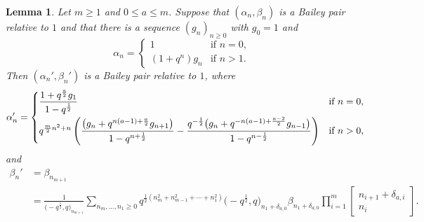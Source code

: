 \documentclass[pdftex]{sigma}
\newtheorem{Lemma}[Theorem]{Lemma}
\numberwithin{equation}{section}
\begin{document}
\begin{Lemma} \label{lemma:dilationpair}
Let $m \geq 1$ and $0 \leq a \leq m$. Suppose that $(\alpha_n,\beta_n)$ is a Bailey pair relative to $1$ and that there is a sequence $(g_n)_{n \geq 0}$ with $g_0 = 1$ and
\begin{equation*}
	\alpha_n =
	\begin{cases}
		1 &\text{if $n= 0$}, \\
		(1+q^n)g_n &\text{if $n > 1$}.
	\end{cases}
\end{equation*}
Then $(\alpha_n',\beta_n')$ is a Bailey pair relative to $1$, where
\begin{gather} \label{eqn:dilationpairalpha}
	\alpha_n' =
	\begin{cases}
		\dfrac{1+q^{\frac{a}{2}}g_1}{1-q^{\frac{1}{2}}} &\text{if $n = 0$}, \vspace{1mm}\\
		q^{\frac{m}{2}n^2+n}\left( \dfrac{\bigl(g_n + q^{n(a-1)+ \frac{a}{2}}g_{n+1}\bigr)}{1-q^{n+\frac{1}{2}}} - \dfrac{q^{-\frac{1}{2}}\bigl(g_n + q^{-n(a-1) + \frac{a-2}{2}}g_{n-1}\bigr)}{1-q^{n - \frac{1}{2}}} \right) &\text{if $n > 0$},
	\end{cases}\!\!\!\!
\end{gather}
and
\begin{align}
		\beta_n' &{}=\beta_{n_{m+1}} \label{eqn:dilationpairbeta}\\
		&{}=
		\frac{1}{\bigl(-q^{\frac{1}{2}},q\bigr)_{n_{m+1}}}
		\sum_{n_{m},\dots,n_1\geq 0}
		q^{\frac{1}{2}(n_{m}^2+n_{m-1}^2+\cdots+n_1^2)}\bigl(-q^{\frac{1}{2}},q\bigr)_{n_1 + \delta_{a,0}}\beta_{n_1 + \delta_{a,0}}
		 \prod_{i=1}^{m} \begin{bmatrix} n_{i+1} + \delta_{a,i} \\ n_i \end{bmatrix}.\nonumber
\end{align}
\end{Lemma}
\end{document}
